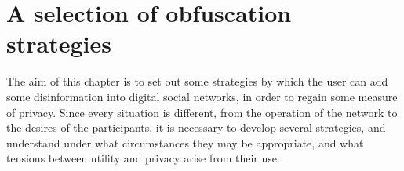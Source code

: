 \documentclass{IOS-Book-Article}     %
\begin{document}







\section{A selection of obfuscation strategies}
\label{sec:strategies}


The aim of this chapter is to set out some strategies by which the user can add
some disinformation into digital social networks, in order to regain some
measure of privacy. Since every situation is different, from the operation of
the network to the desires of the participants, it is necessary to develop
several strategies, and understand under what circumstances they may be
appropriate, and what tensions between utility and privacy arise from their use.
\end{document}
